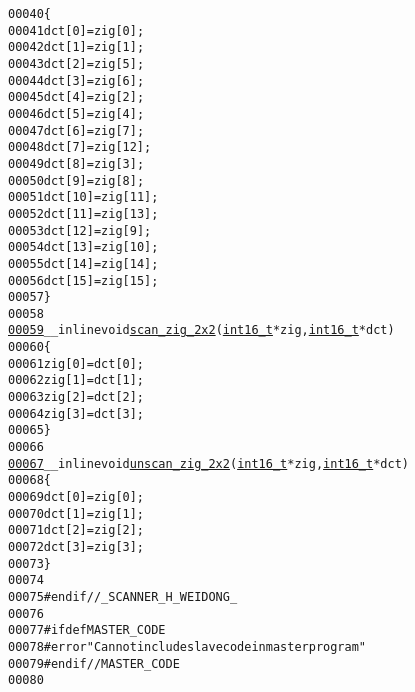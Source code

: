 \begin{footnotesize}
\begin{alltt}
00040 \{
00041     dct[0]  = zig[0] ;
00042     dct[1]  = zig[1] ;
00043         dct[2]  = zig[5] ;
00044         dct[3]  = zig[6] ;
00045     dct[4]  = zig[2] ;
00046     dct[5]  = zig[4] ; 
00047     dct[6]  = zig[7] ;
00048         dct[7]  = zig[12];
00049         dct[8]  = zig[3] ;
00050     dct[9]  = zig[8] ;
00051     dct[10] = zig[11];
00052     dct[11] = zig[13];
00053         dct[12] = zig[9] ;
00054         dct[13] = zig[10];
00055     dct[14] = zig[14];
00056     dct[15] = zig[15];
00057 \}
00058 
\hypertarget{_scanner_8h_source_l00059}{}\hyperlink{_scanner_8h_a8e9caafbe915f392e8ca7dc547e8b12f}{00059} \_\_inline \textcolor{keywordtype}{void} \hyperlink{_scanner_8h_a8e9caafbe915f392e8ca7dc547e8b12f}{scan_zig_2x2}(\hyperlink{_types_8h_ae615613535a2b2445773922f5d45a861}{int16_t}* zig, \hyperlink{_types_8h_ae615613535a2b2445773922f5d45a861}{int16_t}* dct)
00060 \{
00061     zig[0] = dct[0];
00062     zig[1] = dct[1];
00063     zig[2] = dct[2];
00064     zig[3] = dct[3];
00065 \}
00066 
\hypertarget{_scanner_8h_source_l00067}{}\hyperlink{_scanner_8h_aaa0324e6a8196220003838250cc45e75}{00067} \_\_inline \textcolor{keywordtype}{void} \hyperlink{_scanner_8h_aaa0324e6a8196220003838250cc45e75}{unscan_zig_2x2}(\hyperlink{_types_8h_ae615613535a2b2445773922f5d45a861}{int16_t}* zig, \hyperlink{_types_8h_ae615613535a2b2445773922f5d45a861}{int16_t}* dct)
00068 \{
00069     dct[0] = zig[0];
00070     dct[1] = zig[1];
00071     dct[2] = zig[2];
00072     dct[3] = zig[3];
00073 \}
00074 
00075 \textcolor{preprocessor}{#endif //\_SCANNER\_H\_WEIDONG\_}
00076 \textcolor{preprocessor}{}
00077 \textcolor{preprocessor}{#ifdef MASTER\_CODE}
00078 \textcolor{preprocessor}{}\textcolor{preprocessor}{#error "Can not include slave code in master program"}
00079 \textcolor{preprocessor}{}\textcolor{preprocessor}{#endif // MASTER\_CODE}
00080 \textcolor{preprocessor}{}
\end{alltt}\end{footnotesize}
